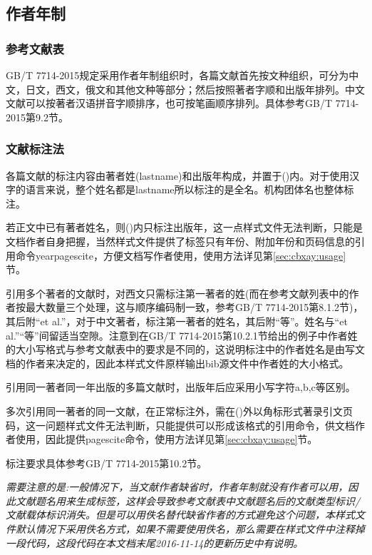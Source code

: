 \subsection{作者年制}

\subsubsection{参考文献表}

GB/T 7714-2015规定采用作者年制组织时，各篇文献首先按文种组织，可分为中文，日文，西文，俄文和其他文种等部分；然后按照著者字顺和出版年排列。中文文献可以按著者汉语拼音字顺排序，也可按笔画顺序排列。具体参考GB/T 7714-2015第9.2节。


\subsubsection{文献标注法}
各篇文献的标注内容由著者姓(lastname)和出版年构成，并置于()内。对于使用汉字的语言来说，整个姓名都是lastname所以标注的是全名。机构团体名也整体标注。

若正文中已有著者姓名，则()内只标注出版年，这一点样式文件无法判断，只能是文档作者自身把握，当然样式文件提供了标签只有年份、附加年份和页码信息的引用命令yearpagescite，方便文档写作者使用，使用方法详见第\ref{sec:cbxay:usage}节。

引用多个著者的文献时，对西文只需标注第一著者的姓(而在参考文献列表中的作者按最大数量三个处理，这与顺序编码制一致，参考GB/T 7714-2015第8.1.2节)，其后附“et al.”，对于中文著者，标注第一著者的姓名，其后附“等”。姓名与“et al.”“等”间留适当空隙。注意到在GB/T 7714-2015第10.2.1节给出的例子中作者姓的大小写格式与参考文献表中的要求是不同的，这说明标注中的作者姓名是由写文档的作者来决定的，因此本样式文件原样输出bib源文件中作者姓的大小格式。

引用同一著者同一年出版的多篇文献时，出版年后应采用小写字符a,b,c等区别。

多次引用同一著者的同一文献，在正常标注外，需在()外以角标形式著录引文页码，这一问题样式文件无法判断，只能提供可以形成该格式的引用命令，供文档作者使用，因此提供pagescite命令，使用方法详见第\ref{sec:cbxay:usage}节。

标注要求具体参考GB/T 7714-2015第10.2节。

\emph{需要注意的是:一般情况下，当文献作者缺省时，作者年制就没有作者可以用，因此文献题名用来生成标签，这样会导致参考文献表中文献题名后的文献类型标识/文献载体标识消失。但是可以用佚名替代缺省作者的方式避免这个问题，本样式文件默认情况下采用佚名方式，如果不需要使用佚名，那么需要在样式文件中注释掉一段代码，这段代码在本文档末尾2016-11-14的更新历史中有说明。}


